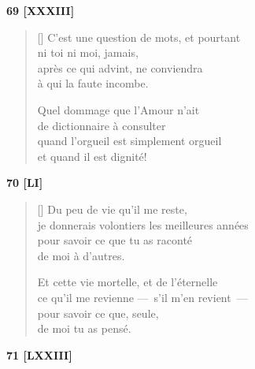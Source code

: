 \documentclass[a4paper,12pt]{book}
\begin{document}
\bigskip

\begin{center}
  \textbf{69 [XXXIII]}
\end{center}

\settowidth{\versewidth}{C'est une question de mots, et pourtant}

\begin{verse}[\versewidth]
  C'est une question de mots, et pourtant \\
  ni toi ni moi, jamais, \\
  après ce qui advint, ne conviendra \\
  à qui la faute incombe.

  Quel dommage que l'Amour n'ait \\
  de dictionnaire à consulter \\
  quand l'orgueil est simplement orgueil \\
  et quand il est dignité!
\end{verse}

\bigskip

\begin{center}
  \textbf{70 [LI]}
\end{center}

\settowidth{\versewidth}{je donnerais volontiers les meilleures années,}

\begin{verse}[\versewidth]
  Du peu de vie qu'il me reste, \\
  je donnerais volontiers les meilleures années \\
  pour savoir ce que tu as raconté \\
  de moi à d'autres.

  Et cette vie mortelle, et de l'éternelle \\
  ce qu'il me revienne ---~s'il m'en revient~--- \\
  pour savoir ce que, seule, \\
  de moi tu as pensé.
\end{verse}

\bigskip

\begin{center}
  \textbf{71 [LXXIII]}
\end{center}
\end{document}
